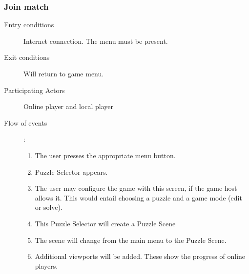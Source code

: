 \documentclass[12pt]{article}
\begin{document}
    \subsubsection{Join match}
    \begin{description}
        \item[Entry conditions] Internet connection. The menu must be present.
        \item[Exit conditions] Will return to game menu.
        \item[Participating Actors] Online player and local player
        \item[Flow of events]:
            \begin{enumerate}
                \item The user presses the appropriate menu button.
                \item Puzzle Selector appears.
                \item The user may configure the game with this screen, if
                    the game host allows it. This would
                    entail choosing a puzzle and a game mode (edit or solve).
                \item This Puzzle Selector will create a Puzzle Scene
                \item The scene will change from the main menu to the Puzzle
                    Scene.
                \item Additional viewports will be added. These show the
                    progress of online players.
            \end{enumerate}
    \end{description}


\end{document}

